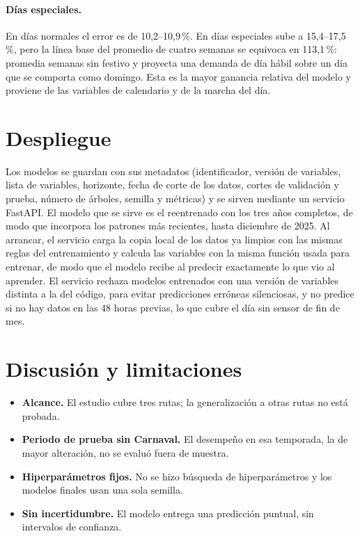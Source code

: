 \documentclass[11pt,a4paper]{article}
\begin{document}
\paragraph{Días especiales.} En días normales el error es de 10,2--10,9\,\%. En días especiales sube a 15,4--17,5\,\%, pero la línea base del promedio de cuatro semanas se equivoca en 113,1\,\%: promedia semanas sin festivo y proyecta una demanda de día hábil sobre un día que se comporta como domingo. Esta es la mayor ganancia relativa del modelo y proviene de las variables de calendario y de la marcha del día.

\section{Despliegue}
\label{sec:despliegue}

Los modelos se guardan con sus metadatos (identificador, versión de variables, lista de variables, horizonte, fecha de corte de los datos, cortes de validación y prueba, número de árboles, semilla y métricas) y se sirven mediante un servicio FastAPI. El modelo que se sirve es el reentrenado con los tres años completos, de modo que incorpora los patrones más recientes, hasta diciembre de 2025. Al arrancar, el servicio carga la copia local de los datos ya limpios con las mismas reglas del entrenamiento y calcula las variables con la misma función usada para entrenar, de modo que el modelo recibe al predecir exactamente lo que vio al aprender. El servicio rechaza modelos entrenados con una versión de variables distinta a la del código, para evitar predicciones erróneas silenciosas, y no predice si no hay datos en las 48 horas previas, lo que cubre el día sin sensor de fin de mes.

\section{Discusión y limitaciones}

\begin{itemize}
  \item \textbf{Alcance.} El estudio cubre tres rutas; la generalización a otras rutas no está probada.
  \item \textbf{Periodo de prueba sin Carnaval.} El desempeño en esa temporada, la de mayor alteración, no se evaluó fuera de muestra.
  \item \textbf{Hiperparámetros fijos.} No se hizo búsqueda de hiperparámetros y los modelos finales usan una sola semilla.
  \item \textbf{Sin incertidumbre.} El modelo entrega una predicción puntual, sin intervalos de confianza.
\end{itemize}
\end{document}
